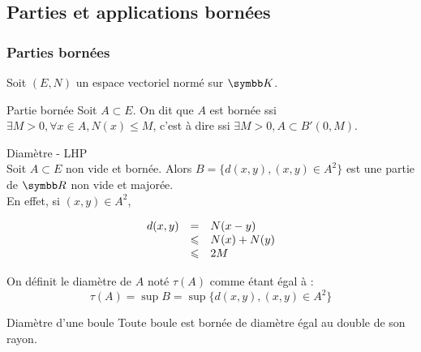 \subsection{Parties et applications bornées}

\subsubsection{Parties bornées}
Soit $(E, N)$ un espace vectoriel normé sur $\K$. 

\begin{definition}{Partie bornée}{}
    Soit $A \subset E$. On dit que $A$ est bornée ssi $\exists M > 0, \forall x \in A, N(x) \leqslant M$, 
    c'est à dire ssi $\exists M > 0, A \subset B'(0, M)$.
\end{definition}

\begin{theoreme}{Diamètre - LHP}{}
    \\Soit $A \subset E$ non vide et bornée. 
    Alors $B = \{d(x, y), (x, y) \in A^2\}$ est une partie de $\R$ non vide et majorée.\\

    En effet, si $(x, y) \in A^2$, 

    \[
    \begin{array}{rcl}
        d(x, y) & = & N(x - y) \\
        \space & \leqslant & N(x) + N(y) \\
        \space & \leqslant & 2 M \\
    \end{array}
    \]

    On définit le diamètre de $A$ noté $\tau(A)$ comme étant égal à : 
    \[\tau(A) = \sup B = \sup \{d(x, y), (x, y) \in A^2\}\]
\end{theoreme}

\begin{proposition}{Diamètre d'une boule}{}
    Toute boule est bornée de diamètre égal au double de son rayon.
\end{proposition}


